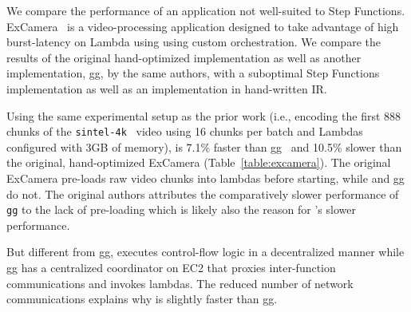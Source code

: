 

We compare the performance of an application not well-suited to Step Functions.
ExCamera~\cite{excamera} is a video-processing application designed to take
advantage of high burst-latency on Lambda using using custom orchestration. We
compare the results of the original hand-optimized implementation as well as
another implementation, gg, by the same authors, with a suboptimal Step
Functions implementation as well as an implementation in hand-written \name{}
IR.

Using the same experimental setup as the prior work (i.e., encoding the first
888 chunks of the \texttt{sintel-4k}~\cite{sintel} video using 16 chunks per
batch and Lambdas configured with 3GB of memory), \name{} is 7.1\% faster than
gg~\cite{gg-atc} and 10.5\% slower than the original, hand-optimized ExCamera
(Table~\ref{table:excamera}). The original ExCamera pre-loads raw video chunks
into lambdas before starting, while \name{} and gg do not. The original
authors attributes the comparatively slower performance of \texttt{gg} to the
lack of pre-loading which is likely also the reason for \name{}'s slower
performance.

But different from gg, \name{} executes control-flow logic in a decentralized
manner while gg has a centralized coordinator on EC2 that proxies
inter-function communications and invokes lambdas. The reduced number of
network communications explains why \name{} is slightly faster than gg.

